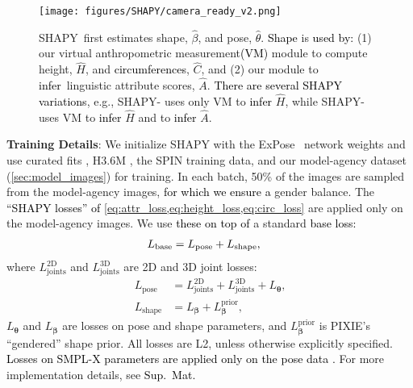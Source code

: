 \documentclass[10pt,twocolumn,letterpaper]{article}
\newcommand{\qheading}[1]{\noindent\textbf{#1}:}
\newcommand{\modelCOLOR}{black}
\newcommand{\modelname}{{\color{\modelCOLOR}SHAPY}\xspace}
\newcommand{\colorattr}{\color{PineGreen}}
\newcommand{\colorheight}{\color{Bittersweet}}
\newcommand{\vanilla}{\mbox{base}\xspace}
\newcommand{\StoM}{VM\xspace}
\newcommand{\StoA}{\text{\mbox{S2A}}\xspace}
\newcommand{\shapyH}{\mbox{\modelname-{\colorheight{H}}}\xspace}
\newcommand{\shapyHA}{\mbox{\modelname-{\colorheight{H}\colorattr{A}}}\xspace}
\newcommand{\pixie}{\mbox{PIXIE}\xspace}
\newcommand{\expose}{\mbox{ExPose}\xspace}
\newcommand{\twoD}{2D\xspace}
\newcommand{\threeD}{3D\xspace}
\newcommand{\smplx}{\mbox{SMPL-X}\xspace}
\newcommand{\supmat}{{\mbox{\textcolor{black}{Sup.~Mat.}}}\xspace}
\newcommand{\shape}{\bm{\beta}}
\newcommand{\pose}{\bm{\theta}}
\renewcommand{\eg}{\mbox{e.g.}\xspace}
\newcommand{\predattr}{A}
\newcommand{\cameraready}[1]{\textcolor{Fuchsia}{{#1}}\xspace}
\renewcommand{\cameraready}[1]{\textcolor{black}{{#1}}\xspace}
\newcommand{\colorTERM}{blue}
\renewcommand{\colorTERM}{black}
\newcommand{\measurement}[0]{{\color{\colorTERM}anthropometric measurement}\xspace}
\newcommand{\scores}[0]{{scores}\xspace}
\newcommand{\linguisticattributescores}[0]{{\color{\colorTERM}linguistic attribute \scores}\xspace}
\begin{document}
\begin{figure}
    \centering
    \texttt{[image: figures/SHAPY/camera\_ready\_v2.png]}
    \caption{\modelname~first estimates shape, \cameraready{$\hat{\beta}$}, and pose, \cameraready{$\hat{\theta}$}. 
        \cameraready{Shape} 
        is \cameraready{used by:} (1) our virtual \measurement \cameraready{(\StoM)} module to compute height, $\hat{H}$, and \cameraready{circumferences}, $\hat{C}$, and 
        (2) our \StoA module to \cameraready{infer}~\linguisticattributescores, $\hat{\predattr}$.
        \cameraready{There are several \modelname variations}, \eg, 
        \shapyH uses only \StoM to \cameraready{infer} $\hat H$, while 
        \shapyHA uses \StoM to \cameraready{infer} $\hat H$ and \StoA to \cameraready{infer} $\hat{\predattr}$.
    }
    \label{fig:shapy_ah1}
\end{figure} 
\smallskip
\qheading{Training Details}
We initialize \modelname with the \expose~\cite{Choutas2020_expose} network weights and use curated fits \cite{Choutas2020_expose}, H3.6M \cite{ionescu2013human36m}, the SPIN \cite{Kolotouros2019_spin} training data, and our model-agency dataset (\cref{sec:model_images}) for training.
In each batch, 50\% of the images are sampled from the model-agency images,
\cameraready{for which we ensure a} gender balance.
The 
\cameraready{``\modelname losses'' of \cref{eq:attr_loss,eq:height_loss,eq:circ_loss}} 
are 
applied only on the model-agency images. 
We use \cameraready{these on top of} a standard \cameraready{base loss:} \begin{align}
    L_\text{\vanilla} &= L_\text{pose} + L_\text{shape} \text{,}                      \end{align}
where 
$L_\text{joints}^{\text{\twoD}}$ and $L_\text{joints}^{\text{\threeD}}$ are \twoD and \threeD joint losses:
\begin{align}
    L_\text{pose}     &= L_\text{joints}^{\text{\twoD}} + L_\text{joints}^{\text{\threeD}} + L_{\pose} \text{,} \\
    L_\text{shape}    &= L_{\shape} + L_{\shape}^{\text{prior}} \text{,}
\end{align}
$L_{\pose}$             and 
$L_{\shape}$            are losses on pose and shape parameters, and 
$L_{\shape}^{\text{prior}}$ is \pixie's \cite{feng2021pixie} ``gendered'' shape prior.
All losses are L2, unless otherwise explicitly specified.
\cameraready{Losses on \smplx parameters are applied only on the 
pose data \mbox{\cite{ionescu2013human36m,Choutas2020_expose,Kolotouros2019_spin}}.}
For more implementation details, see \supmat
\end{document}
